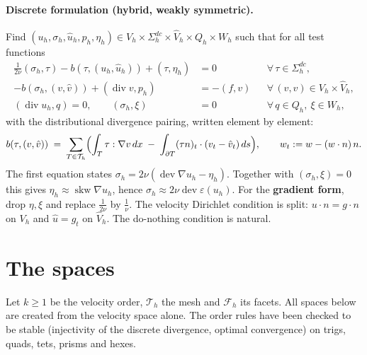 \documentclass[10pt,a4paper]{article}
\newcommand{\dev}{\operatorname{dev}}
\newcommand{\Th}{\mathcal{T}_h}
\newcommand{\Fh}{\mathcal{F}_h}
\begin{document}
\paragraph{Discrete formulation (hybrid, weakly symmetric).}
Find $(u_h,\sigma_h,\hat u_h,p_h,\eta_h) \in V_h\times\Sigma_h^{dc}\times\hat V_h\times Q_h\times W_h$ such that for all test functions
\begin{align*}
  \tfrac{1}{2\nu}(\sigma_h,\tau) - b(\tau,(u_h,\hat u_h)) + (\tau,\eta_h) &= 0 && \forall\, \tau \in \Sigma_h^{dc},\\
  -b(\sigma_h,(v,\hat v)) + (\operatorname{div} v, p_h) &= -(f,v) && \forall\, (v,\hat v) \in V_h\times\hat V_h,\\
  (\operatorname{div} u_h, q) = 0, \qquad (\sigma_h,\xi) &= 0 && \forall\, q\in Q_h,\ \xi\in W_h,
\end{align*}
with the distributional divergence pairing, written element by element:
\[
  b(\tau,(v,\hat v)) \;=\; \sum_{T\in\Th}\Bigl( \int_T \tau : \nabla v \,dx \;-\; \int_{\partial T} (\tau n)_t\cdot(v_t - \hat v_t)\,ds \Bigr),
  \qquad w_t := w - (w\cdot n)\,n .
\]
The first equation states $\sigma_h = 2\nu(\dev\nabla u_h - \eta_h)$. Together with $(\sigma_h,\xi)=0$ this gives $\eta_h \approx \operatorname{skw}\nabla u_h$, hence $\sigma_h \approx 2\nu\dev\varepsilon(u_h)$.
For the \textbf{gradient form}, drop $\eta,\xi$ and replace $\tfrac{1}{2\nu}$ by $\tfrac1\nu$.
The velocity Dirichlet condition is split: $u\cdot n = g\cdot n$ on $V_h$ and $\hat u = g_t$ on $\hat V_h$. The do-nothing condition is natural.

\section{The spaces}

Let $k\ge 1$ be the velocity order, $\Th$ the mesh and $\Fh$ its facets. All spaces below are created from the velocity space alone. The order rules have been checked to be stable (injectivity of the discrete divergence, optimal convergence) on trigs, quads, tets, prisms and hexes.
\end{document}
